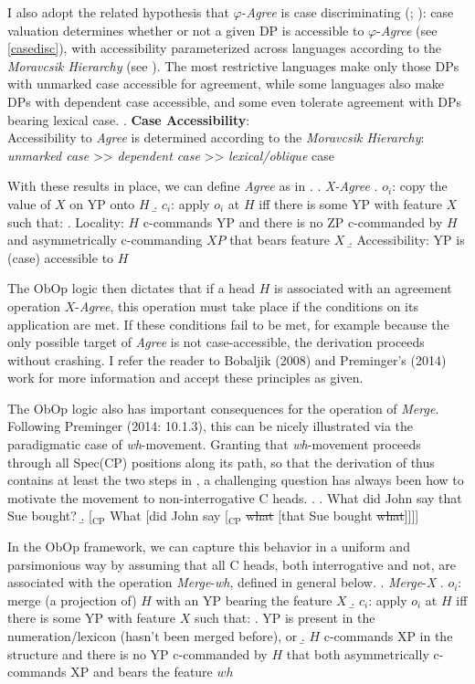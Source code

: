 \documentclass[11pt, letterpaper]{paper_nick}
\begin{document}
I also adopt the related hypothesis that $\varphi$-\emph{Agree} is case discriminating (\citealt{bobaljik08}; \citealt{preminger14}): case valuation determines whether or not a given DP is accessible to $\varphi$-\emph{Agree} (see \ref{casedisc}), with accessibility parameterized across languages according to the \emph{Moravcsik Hierarchy} (see \Next[b]). The most restrictive languages make only those DPs with unmarked case accessible for agreement, while some languages also make DPs with dependent case accessible, and some even tolerate agreement with DPs bearing lexical case.
\ex.\label{ca} \textbf{Case Accessibility}:\\
Accessibility to \emph{Agree} is determined according to the \emph{Moravcsik Hierarchy}:\\
\emph{unmarked case} >> \emph{dependent case} >> \emph{lexical/oblique} case

With these results in place, we can define \emph{Agree} as in \Next.
\ex. \emph{X-Agree}
\a. $o_i$: copy the value of $X$ on YP onto $H$
\b. $c_i$: apply $o_i$ at $H$ iff there is some YP with feature $X$ such that:
\a. Locality: $H$ c-commands YP and there is no ZP c-commanded by $H$ and asymmetrically c-commanding $XP$ that bears feature $X$
\b. Accessibility: YP is (case) accessible to $H$

The ObOp logic then dictates that if a head $H$ is associated with an agreement operation $X$-\emph{Agree}, this operation must take place if the conditions on its application are met. If these conditions fail to be met, for example because the only possible target of \emph{Agree} is not case-accessible, the derivation proceeds without crashing. I refer the reader to Bobaljik (2008) and Preminger's (2014) work for more information and accept these principles as given.  

The ObOp logic also has important consequences for the operation of \emph{Merge}. Following Preminger (2014: 10.1.3), this can be nicely illustrated via the paradigmatic case of \emph{wh}-movement. Granting that \emph{wh}-movement proceeds through all Spec(CP) positions along its path, so that the derivation of \Next[a] thus contains at least the two steps in \Next[b], a challenging question has always been how to motivate the movement to non-interrogative C heads. 
\ex. \a. What did John say that Sue bought?
\b. [$_\text{CP}$ What [did John say [$_\text{CP}$ \st{what} [that Sue bought \st{what}]]]]

In the ObOp framework, we can capture this behavior in a uniform and parsimonious way by assuming that all C heads, both interrogative and not, are associated with the operation \emph{Merge}-\emph{wh}, defined in general below.
\ex. \emph{Merge}-\emph{X}
\a. $o_i$: merge (a projection of) $H$ with an YP bearing the feature $X$
\b. $c_i$: apply $o_i$ at $H$ iff there is some YP with feature $X$ such that:
\a. YP is present in the numeration/lexicon (hasn't been merged before), or 
\b. $H$ c-commands XP in the structure and there is no YP c-commanded by $H$ that both asymmetrically c-commands XP and bears the feature $wh$
\end{document}
